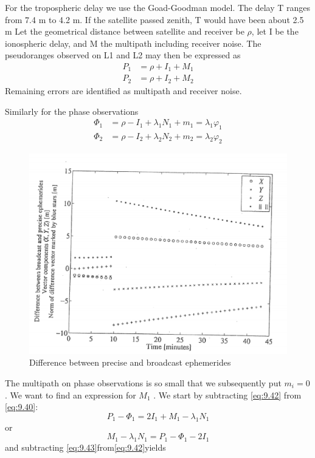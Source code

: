 		For the tropospheric delay we use the Goad-Goodman model. The delay T ranges from 7.4 m to 4.2 m. If the satellite passed zenith, T would have been about 2.5 m
		Let the geometrical distance between satellite and receiver be $\rho$, let I be the ionospheric delay, and M the multipath including receiver noise. The pseudoranges observed on L1 and L2 may then be expressed as
		\begin{align}\label{eq:9.40}
			P_1&=\rho+I_1+M_1 \\
			P_2&=\rho+I_2+M_2 
		\end{align}\label{eq:9.41}
		Remaining errors are identified as multipath and receiver noise.
		
		Similarly for the phase observations
		\begin{align}\label{eq:9.42}
			\Phi_1&=\rho-I_1+\lambda_1N_1+m_1=\lambda_1\varphi_1 \\
			\Phi_2&=\rho-I_2+\lambda_2N_2+m_2=\lambda_2\varphi_2 
		\end{align}\label{eq:9.43}
		\begin{figure}
			\centering
			\includegraphics[width=0.7\linewidth]{TeX_files/Part03/chapter09/image/9-17}
			\caption{Difference between precise and broadcast ephemerides}
			\label{fig:9-17}
		\end{figure}
		The multipath on phase observations is so small that we subsequently put $m_i = 0$. We
		want to find an expression for $M_1$ . We start by subtracting \ref{eq:9.42} from \ref{eq:9.40}:
		\begin{equation*}
			P_1-\Phi_1=2I_1+M_1-\lambda_1N_1
		\end{equation*}
		or
		\begin{equation}\label{eq:9.44}
			M_1-\lambda_1N_1=P_1-\Phi_1-2I_1
		\end{equation}
		and subtracting \ref{eq:9.43}from\ref{eq:9.42}yields
